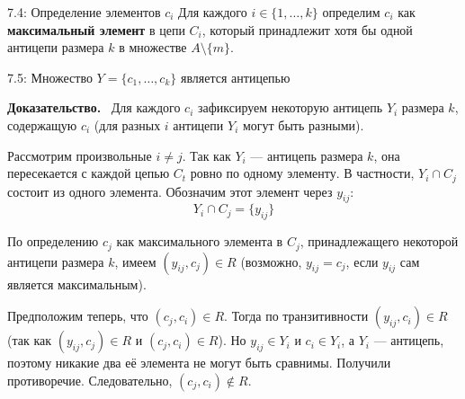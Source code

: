 \documentclass[a4paper,12pt]{article}
\newcommand{\myproof}{\textbf{Доказательство.}\ }
\begin{document}
	\begin{definitionbox}{7.4: Определение элементов $c_i$}
		Для каждого $i \in \{1,\dots,k\}$ определим $c_i$ как \textbf{максимальный элемент} в цепи $C_i$, который принадлежит хотя бы одной антицепи размера $k$ в множестве $A \setminus \{m\}$.
	\end{definitionbox}
	
	\begin{lemmabox}{7.5: \texorpdfstring{Множество $Y = \{c_1, \dots, c_k\}$ является антицепью}{Множество Y = {c_1, ..., c_k} является антицепью}}
	\end{lemmabox}
	
	\myproof
	Для каждого $c_i$ зафиксируем некоторую антицепь $Y_i$ размера $k$, содержащую $c_i$ (для разных $i$ антицепи $Y_i$ могут быть разными).
	
	Рассмотрим произвольные $i \neq j$. Так как $Y_i$ — антицепь размера $k$, она пересекается с каждой цепью $C_t$ ровно по одному элементу. В частности, $Y_i \cap C_j$ состоит из одного элемента. Обозначим этот элемент через $y_{ij}$:
	\[ Y_i \cap C_j = \{y_{ij}\} \]
	
	По определению $c_j$ как максимального элемента в $C_j$, принадлежащего некоторой антицепи размера $k$, имеем $(y_{ij}, c_j) \in R$ (возможно, $y_{ij} = c_j$, если $y_{ij}$ сам является максимальным).
	
	\begin{center}
	\end{center}
	
	Предположим теперь, что $(c_j, c_i) \in R$. Тогда по транзитивности $(y_{ij}, c_i) \in R$ (так как $(y_{ij}, c_j) \in R$ и $(c_j, c_i) \in R$). Но $y_{ij} \in Y_i$ и $c_i \in Y_i$, а $Y_i$ — антицепь, поэтому никакие два её элемента не могут быть сравнимы. Получили противоречие. Следовательно, $(c_j, c_i) \notin R$.
	
\end{document}
